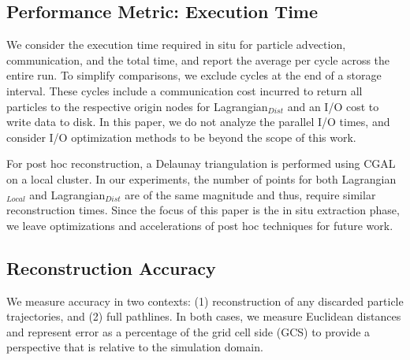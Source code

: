\subsection{Performance Metric: Execution Time}
%
We consider the execution time required in situ for particle advection, communication, and the total time, and report the average per cycle across the entire run.
%
To simplify comparisons, we exclude cycles at the end of a storage interval. 
%
These cycles include a communication cost incurred to return all particles to the respective origin nodes for Lagrangian$_{Dist}$ and an I/O cost to write data to disk.
%
In this paper, we do not analyze the parallel I/O times, and consider I/O optimization methods to be beyond the scope of this work.

For post hoc reconstruction, a Delaunay triangulation is performed using CGAL~\cite{2020cgal} on a local cluster.
%
In our experiments, the number of points for both Lagrangian$_{Local}$ and Lagrangian$_{Dist}$ are of the same magnitude and thus, require similar reconstruction times.
%
%
%
%
%
%
Since the focus of this paper is the in situ extraction phase, we leave optimizations and accelerations of post hoc techniques for future work.
\subsection{Reconstruction Accuracy}
We measure accuracy in two contexts: (1) reconstruction of any discarded particle trajectories, and (2) full pathlines.  
%
In both cases, we measure Euclidean distances and represent error as a percentage of the grid cell side (GCS) to provide a perspective that is relative to the simulation domain.

